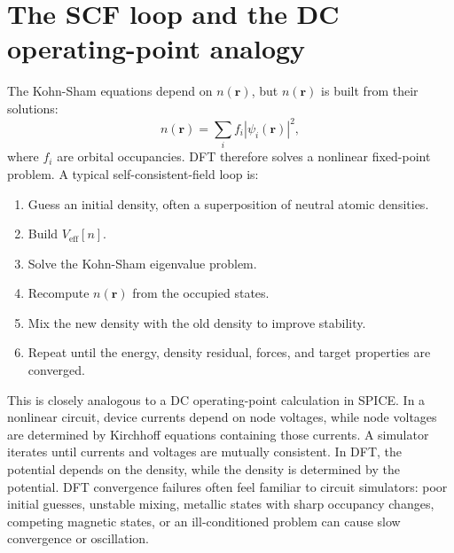 \documentclass[11pt]{article}
\begin{document}
\section{The SCF loop and the DC operating-point analogy}

The Kohn-Sham equations depend on $n(\mathbf r)$, but $n(\mathbf r)$ is built from their solutions:
\begin{equation}
 n(\mathbf r)=\sum_i f_i |\psi_i(\mathbf r)|^2,
\end{equation}
where $f_i$ are orbital occupancies.  DFT therefore solves a nonlinear fixed-point problem.  A typical self-consistent-field loop is:
\begin{enumerate}
\item Guess an initial density, often a superposition of neutral atomic densities.
\item Build $V_{\mathrm{eff}}[n]$.
\item Solve the Kohn-Sham eigenvalue problem.
\item Recompute $n(\mathbf r)$ from the occupied states.
\item Mix the new density with the old density to improve stability.
\item Repeat until the energy, density residual, forces, and target properties are converged.
\end{enumerate}

This is closely analogous to a DC operating-point calculation in SPICE.  In a nonlinear circuit, device currents depend on node voltages, while node voltages are determined by Kirchhoff equations containing those currents.  A simulator iterates until currents and voltages are mutually consistent.  In DFT, the potential depends on the density, while the density is determined by the potential.  DFT convergence failures often feel familiar to circuit simulators: poor initial guesses, unstable mixing, metallic states with sharp occupancy changes, competing magnetic states, or an ill-conditioned problem can cause slow convergence or oscillation.
\end{document}
